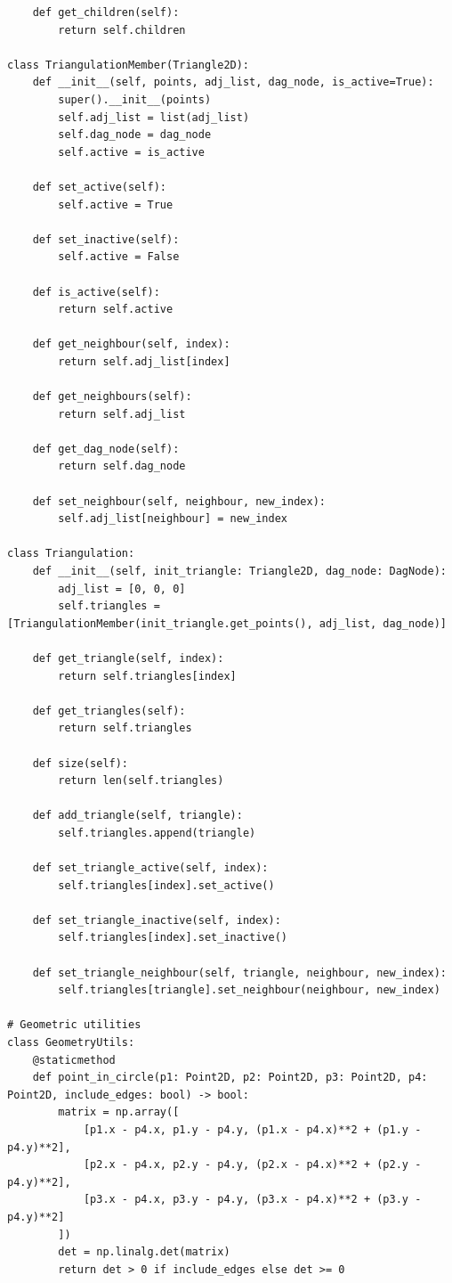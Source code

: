 \documentclass{article}
\begin{document}
\begin{lstlisting}
    def get_children(self):
        return self.children

class TriangulationMember(Triangle2D):
    def __init__(self, points, adj_list, dag_node, is_active=True):
        super().__init__(points)
        self.adj_list = list(adj_list)
        self.dag_node = dag_node
        self.active = is_active
    
    def set_active(self):
        self.active = True
    
    def set_inactive(self):
        self.active = False
    
    def is_active(self):
        return self.active
    
    def get_neighbour(self, index):
        return self.adj_list[index]
    
    def get_neighbours(self):
        return self.adj_list
    
    def get_dag_node(self):
        return self.dag_node
    
    def set_neighbour(self, neighbour, new_index):
        self.adj_list[neighbour] = new_index

class Triangulation:
    def __init__(self, init_triangle: Triangle2D, dag_node: DagNode):
        adj_list = [0, 0, 0]
        self.triangles = [TriangulationMember(init_triangle.get_points(), adj_list, dag_node)]
    
    def get_triangle(self, index):
        return self.triangles[index]
    
    def get_triangles(self):
        return self.triangles
    
    def size(self):
        return len(self.triangles)
    
    def add_triangle(self, triangle):
        self.triangles.append(triangle)
    
    def set_triangle_active(self, index):
        self.triangles[index].set_active()
    
    def set_triangle_inactive(self, index):
        self.triangles[index].set_inactive()
    
    def set_triangle_neighbour(self, triangle, neighbour, new_index):
        self.triangles[triangle].set_neighbour(neighbour, new_index)

# Geometric utilities
class GeometryUtils:
    @staticmethod
    def point_in_circle(p1: Point2D, p2: Point2D, p3: Point2D, p4: Point2D, include_edges: bool) -> bool:
        matrix = np.array([
            [p1.x - p4.x, p1.y - p4.y, (p1.x - p4.x)**2 + (p1.y - p4.y)**2],
            [p2.x - p4.x, p2.y - p4.y, (p2.x - p4.x)**2 + (p2.y - p4.y)**2],
            [p3.x - p4.x, p3.y - p4.y, (p3.x - p4.x)**2 + (p3.y - p4.y)**2]
        ])
        det = np.linalg.det(matrix)
        return det > 0 if include_edges else det >= 0


\end{lstlisting}
\end{document}
